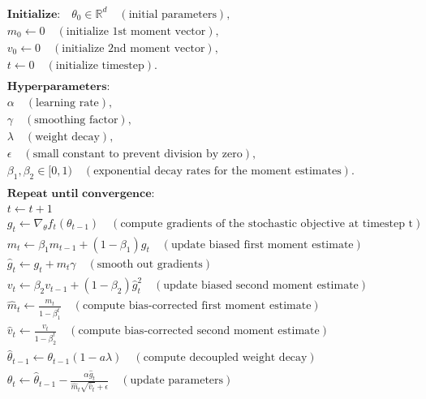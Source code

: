 \begin{align}
    
    &\textbf{Initialize:} \quad \theta_0 \in \mathbb{R}^d \quad (\text{initial parameters}), \\
    &m_0 \leftarrow 0 \quad (\text{initialize 1st moment vector}), \\
    &v_0 \leftarrow 0 \quad (\text{initialize 2nd moment vector}), \\
    &t \leftarrow 0 \quad (\text{initialize timestep}). \\
    \\
    
    &\textbf{Hyperparameters:} \\
    &\alpha \quad (\text{learning rate}), \\
    &\gamma \quad (\text{smoothing factor}), \\
    &\lambda \quad (\text{weight decay}), \\
    &\epsilon \quad (\text{small constant to prevent division by zero}), \\
    &\beta_1, \beta_2 \in [0,1) \quad (\text{exponential decay rates for the moment estimates}). \\
    \\
    
    &\textbf{Repeat until convergence:} \\
    &t \leftarrow t + 1 \\
    &g_t \leftarrow \nabla_{\theta} f_t(\theta_{t-1}) \quad (\text{compute gradients of the stochastic objective at timestep t}) \\
    &m_t \leftarrow \beta_1 m_{t-1} + (1 - \beta_1) g_t \quad (\text{update biased first moment estimate}) \\
    &\hat{g}_t \leftarrow g_t +m_t \gamma \quad (\text{smooth out gradients}) \\
    &v_t \leftarrow \beta_2 v_{t-1} + (1 - \beta_2) \hat{g}_t^2 \quad (\text{update biased second moment estimate}) \\
    &\hat{m}_t \leftarrow \frac{m_t}{1 - \beta_1^t} \quad (\text{compute bias-corrected first moment estimate}) \\
    &\hat{v}_t \leftarrow \frac{v_t}{1 - \beta_2^t} \quad (\text{compute bias-corrected second moment estimate}) \\
    &\hat\theta_{t-1} \leftarrow \theta_{t-1}(1-a\lambda)\quad (\text{compute decoupled weight decay}) \\
    &\theta_t \leftarrow \hat\theta_{t-1} - \frac{\alpha\hat{g}_t}{\hat{m}_t\sqrt{\hat{v}_t} + \epsilon} \quad (\text{update parameters})
    \\

\end{align} \\
    